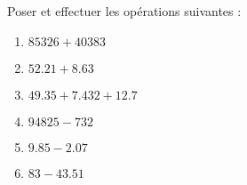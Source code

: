 \begin{exercice}
    Poser et effectuer les opérations suivantes :
    \begin{multicols}{2}
        \begin{spacing}{1.5}
            \begin{enumerate}
                \item $\num{85326}+\num{40383}$
                \item $\num{52.21}+\num{8.63}$
                \item $\num{49.35}+\num{7.432}+\num{12.7}$
                \item $\num{94825}-\num{732}$
                \item $\num{9.85}-\num{2.07}$
                \item $\num{83}-\num{43.51}$
            \end{enumerate}
        \end{spacing}
    \end{multicols}
 \end{exercice}
